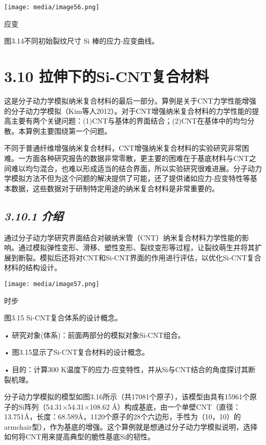 \documentclass[
]{article}
\begin{document}
\texttt{[image: media/image56.png]}

应变

图3.14不同初始裂纹尺寸 Si 棒的应力-应变曲线。

\hypertarget{ux62c9ux4f38ux4e0bux7684si-cntux590dux5408ux6750ux6599}{%
\section{3.10
拉伸下的Si-CNT复合材料}\label{ux62c9ux4f38ux4e0bux7684si-cntux590dux5408ux6750ux6599}}

这是分子动力学模拟纳米复合材料的最后一部分。算例是关于CNT力学性能增强的分子动力学模拟（Kim等人2012）。对于CNT增强纳米复合材料的力学性能的提高主要有两个关键问题：(1)CNT与基体的界面结合；(2)CNT在基体中的均匀分散。本算例主要围绕第一个问题。

不同于普通纤维增强纳米复合材料，CNT增强纳米复合材料的实验研究非常困难。一方面各种研究报告的数据非常零散，更主要的困难在于基底材料与CNT之间难以均匀混合，也难以形成适当的结合界面，所以实验研究很难进展。分子动力学模拟方法不但为这个问题的解决提供了可能，还了提供诸如应力-应变特性等基本数据，这些数据对于研制特定用途的纳米复合材料是非常重要的。

\hypertarget{ux4ecbux7ecd-1}{%
\subsection{\texorpdfstring{\emph{3.10.1
介绍}}{3.10.1 介绍}}\label{ux4ecbux7ecd-1}}

通过分子动力学研究界面结合对碳纳米管（CNT）纳米复合材料力学性能的影响。通过模拟弹性变形、滑移、塑性变形、裂纹变形等过程，让裂纹萌生并将其扩展到断裂。模拟后还将对CNT和Si-CNT界面的作用进行评估，以优化Si-CNT复合材料的结构设计。

\texttt{[image: media/image57.png]}

时步

图3.15 Si-CNT复合体系的设计概念。

• 研究对象(体系)：前面两部分的模拟对象Si-CNT组合。

• 图3.15显示了Si-CNT复合材料的设计概念。

• 目的：计算300
K温度下的应力-应变特性，并从Si与CNT结合的角度探讨其断裂机理。

分子动力学模拟的模型如图3.16所示（共17081个原子），该模型由具有15961个原子的Si阵列（54.31×54.31×108.62
Å）构成基底，由一个单壁CNT（直径：13.751Å，长度：68.589Å，1120个原子的28个六边形，手性为（10，10）的armchair型），作为基底的增强。这个算例就是想通过分子动力学模拟说明，选择如何将CNT用来提高典型的脆性基底Si的韧性。
\end{document}
